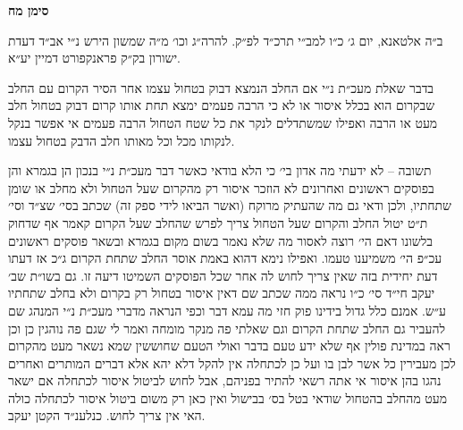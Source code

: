 \documentclass[12pt, openany]{book}
\newcommand{\chapname}{}
\newcommand{\newchap}[1]{
	\addcontentsline{toc}{chapter}{#1}
	\renewcommand{\chapname}{#1}
		\begin{center}
			\textbf{%
\fontsize{16pt}{16pt}\selectfont
				#1}
		\end{center}
}
\begin{document}
\newchap{סימן מח}
\begin{multicols}{2}
ב״ה אלטאנא, יום ג׳ כ״ו למב״י תרכ״ד לפ״ק. להרה״ג וכו׳ מ״ה שמשון הירש נ״י אב״ד דעדת ישורון בק״ק פראנקפורט דמיין יע״א.\\\vspace{0pt}

בדבר שאלת מעכ״ת נ״י אם החלב הנמצא דבוק בטחול עצמו אחר הסיר הקרום עם החלב שבקרום הוא בכלל איסור או לא כי הרבה פעמים ימצא תחת אותו קרום דבוק בטחול חלב מעט או הרבה ואפילו שמשתדלים לנקר את כל שטח הטחול הרבה פעמים אי אפשר בנקל לנקותו מכל וכל מאותו חלב הדבק בטחול עצמו.\\\vspace{0pt}

תשובה – לא ידעתי מה אדון בי׳ כי הלא בודאי כאשר דבר מעכ״ת נ״י בנכון הן בגמרא והן בפוסקים ראשונים ואחרונים לא הוזכר איסור רק מהקרום שעל הטחול ולא מחלב או שומן שתחתיו, ולכן ודאי גם מה שהעתיק מרוקח (ואשר הביאו לידי ספק זה) שכתב בסי׳ שצ״ד וסי׳ ת״ט יטול החלב והקרום שעל הטחול צריך לפרש שהחלב שעל הקרום קאמר אף שדחוק בלשונו דאם הי׳ רוצה לאסור מה שלא נאמר בשום מקום בגמרא ובשאר פוסקים ראשונים עכ״פ הי׳ משמיענו טעמו. ואפילו נימא דהוא באמת אוסר החלב שתחת הקרום ג״כ אז דעתו דעת יחידית בזה שאין צריך לחוש לה אחר שכל הפוסקים השמיטו דיעה זו. גם בשו״ת שב׳ יעקב חי״ד סי׳ כ״ו נראה ממה שכתב שם דאין איסור בטחול רק בקרום ולא בחלב שתחתיו ע״ש. אמנם כלל גדול בידינו פוק חזי מה עמא דבר וכפי הנראה מדברי מעכ״ת נ״י המנהג שם להעביר גם החלב שתחת הקרום וגם שאלתי פה מנקר מומחה ואמר לי שגם פה נוהגין כן וכן ראה במדינת פולין אף שלא ידע טעם בדבר ואולי הטעם שחוששין שמא נשאר מעט מהקרום לכן מעבירין כל אשר לבן בו ועל כן לכתחלה אין להקל דלא יהא אלא דברים המותרים ואחרים נהגו בהן איסור אי אתה רשאי להתיר בפניהם, אבל לחוש לביטול איסור לכתחלה אם ישאר מעט מהחלב בהטחול שודאי בטל בס׳ בבישול ואין כאן רק משום ביטול איסור לכתחלה כולה האי אין צריך לחוש. כנלענ״ד הקטן יעקב.\\\vspace{0pt}

\end{multicols}\newpage
\end{document}
